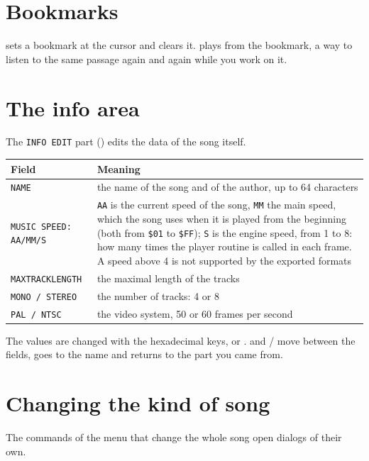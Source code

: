 \section{Bookmarks}

 sets a bookmark at the cursor and  clears it.  plays from the bookmark, a way to
listen to the same passage again and again while you work on it.

\section{The info area}

The \texttt{INFO EDIT} part () edits the data of the song itself.

\begin{center}
\begin{tabular}{@{}lp{10cm}@{}}
\toprule
Field & Meaning \\ \midrule
\texttt{NAME} & the name of the song and of the author, up to 64 characters \\
\texttt{MUSIC SPEED: AA/MM/S} & \texttt{AA} is the current speed of the song, \texttt{MM} the main speed, which the song uses when it
   is played from the beginning (both from \texttt{\$01} to \texttt{\$FF}); \texttt{S} is the engine speed, from 1 to 8: how many times the
   player routine is called in each frame. A speed above 4 is not supported by the exported formats \\
\texttt{MAXTRACKLENGTH} & the maximal length of the tracks \\
\texttt{MONO / STEREO} & the number of tracks: 4 or 8 \\
\texttt{PAL / NTSC} & the video system, 50 or 60 frames per second \\
\bottomrule
\end{tabular}
\end{center}

The values are changed with the hexadecimal keys, or .  and / move between the
fields,  goes to the name and  returns to the part you came from.

\section{Changing the kind of song}

The commands of the  menu that change the whole song open dialogs of their own.

